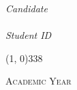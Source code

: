 \begin{titlepage}
\begin{center}
\begin{large}

            \begin{flushright}
                \textit{Candidate}\\
                \vspace{5pt}
                \myName \\
                \vspace{5pt}
                \textit{Student ID}\\ \myID
            \end{flushright}
        \end{large}

        \vspace{20pt}

        \line(1, 0){338} \\
        \begin{normalsize}
            \textsc{Academic Year \myAA}
        \end{normalsize}
    \end{center}
\end{titlepage}
